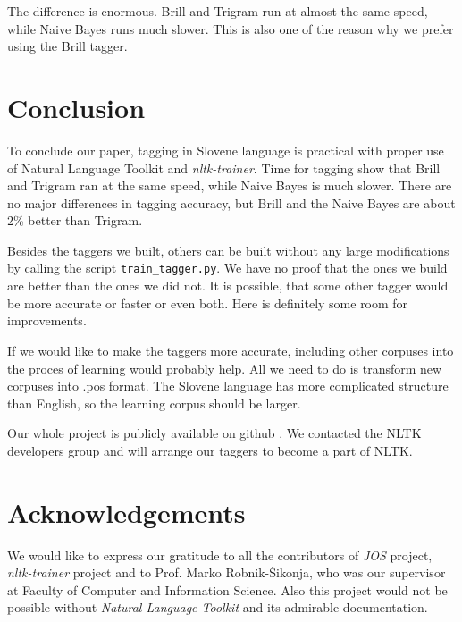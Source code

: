 \documentclass[10pt, conference, compsocconf]{IEEEtran}
\begin{document}
The difference is enormous. Brill and Trigram run at almost the same speed, while Naive Bayes runs much slower. This is also one of the reason why we prefer using the Brill tagger. 

\section{Conclusion} %
To conclude our paper, tagging in Slovene language is practical with proper use of Natural Language Toolkit and \textit{nltk-trainer}. Time for tagging show that Brill and Trigram ran at the same speed, while Naive Bayes is much slower. There are no major differences in tagging accuracy, but Brill and the Naive Bayes are about 2\% better than Trigram.
\par
Besides the taggers we built, others can be built without any large modifications by calling the script \texttt{train\_tagger.py}. We have no proof that the ones we build are better than the ones we did not. It is possible, that some other tagger would be more accurate or faster or even both. Here is definitely some room for improvements.
\par
If we would like to make the taggers more accurate, including other corpuses into the proces of learning would probably help. All we need to do is transform new corpuses into .pos format. The Slovene language has more complicated structure than English, so the learning corpus should be larger.
\par
Our whole project is publicly available on github \cite{CODE}. We contacted the NLTK developers group and will arrange our taggers to become a part of NLTK.

\section*{Acknowledgements} %
We would like to express our gratitude to all the contributors of \textit{JOS} \cite{JOS} project, \textit{nltk-trainer} \cite{nltk-trainer} project and to Prof. Marko Robnik-Šikonja, who was our supervisor at Faculty of Computer and Information Science. Also this project would not be possible without \textit{Natural Language Toolkit} \cite{nltk} and its admirable documentation.
\end{document}
